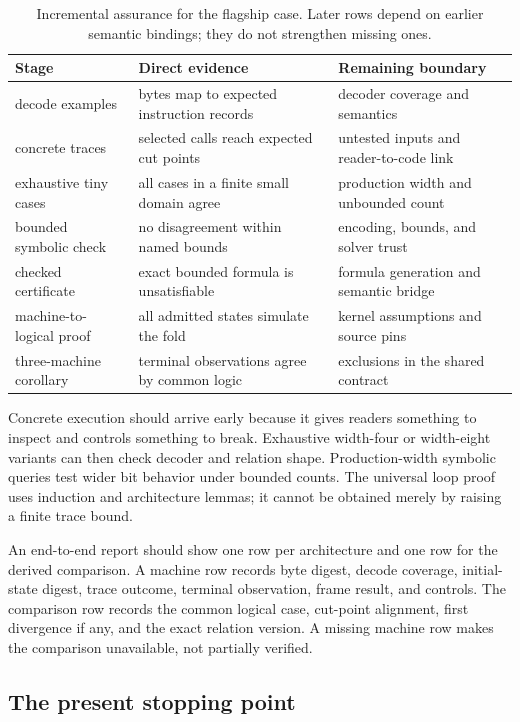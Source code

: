 \begin{table}[htbp]
\centering
\caption{Incremental assurance for the flagship case. Later rows depend on
earlier semantic bindings; they do not strengthen missing ones.}
\begin{tabular}{@{}p{}p{}p{}@{}}
\toprule
Stage & Direct evidence & Remaining boundary \\
\midrule
decode examples & bytes map to expected instruction records & decoder coverage and semantics \\
concrete traces & selected calls reach expected cut points & untested inputs and reader-to-code link \\
exhaustive tiny cases & all cases in a finite small domain agree & production width and unbounded count \\
bounded symbolic check & no disagreement within named bounds & encoding, bounds, and solver trust \\
checked certificate & exact bounded formula is unsatisfiable & formula generation and semantic bridge \\
machine-to-logical proof & all admitted states simulate the fold & kernel assumptions and source pins \\
three-machine corollary & terminal observations agree by common logic & exclusions in the shared contract \\
\bottomrule
\end{tabular}
\label{tab:xor-assurance-ladder}
\end{table}

Concrete execution should arrive early because it gives readers something to
inspect and controls something to break. Exhaustive width-four or width-eight
variants can then check decoder and relation shape. Production-width symbolic
queries test wider bit behavior under bounded counts. The universal loop proof
uses induction and architecture lemmas; it cannot be obtained merely by
raising a finite trace bound.

An end-to-end report should show one row per architecture and one row for the
derived comparison. A machine row records byte digest, decode coverage,
initial-state digest, trace outcome, terminal observation, frame result, and
controls. The comparison row records the common logical case, cut-point
alignment, first divergence if any, and the exact relation version. A missing
machine row makes the comparison unavailable, not partially verified.

\subsection{The present stopping point}


